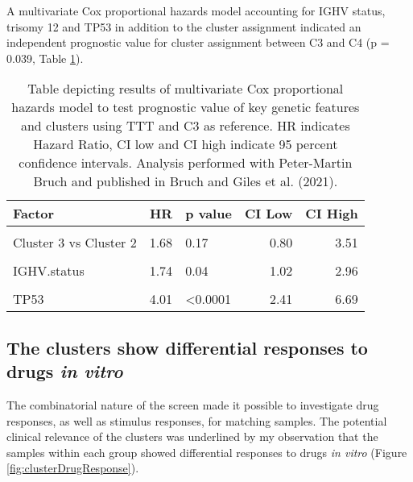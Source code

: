 \documentclass[11pt, a4paper, twosided]{book}
\begin{document}
A multivariate Cox proportional hazards model accounting for IGHV status, trisomy 12 and TP53 in addition to the cluster assignment indicated an independent prognostic value for cluster assignment between C3 and C4 (p = 0.039, Table \ref{tab:clusterCox}).
\begin{table}

\caption{\label{tab:clusterCox}Table depicting results of multivariate Cox proportional hazards model to test prognostic value of key genetic features and clusters using TTT and C3 as reference. HR indicates Hazard Ratio, CI low and CI high indicate 95 percent confidence intervals. Analysis performed with Peter-Martin Bruch and published in Bruch and Giles et al. (2021).}
\centering
\fontsize{7}{9}\selectfont
\begin{tabular}[t]{l|r|l|r|r}
\hline
Factor & HR & p value & CI Low & CI High\\
\hline
\cellcolor[HTML]{E2E868}{Cluster 3 vs Cluster 1} & \cellcolor[HTML]{E2E868}{0.96} & \cellcolor[HTML]{E2E868}{0.89} & \cellcolor[HTML]{E2E868}{0.54} & \cellcolor[HTML]{E2E868}{1.72}\\
\hline
Cluster 3 vs Cluster 2 & 1.68 & 0.17 & 0.80 & 3.51\\
\hline
\cellcolor[HTML]{E2E868}{Cluster 3 vs Cluster 4} & \cellcolor[HTML]{E2E868}{0.44} & \cellcolor[HTML]{E2E868}{0.04} & \cellcolor[HTML]{E2E868}{0.20} & \cellcolor[HTML]{E2E868}{0.96}\\
\hline
IGHV.status & 1.74 & 0.04 & 1.02 & 2.96\\
\hline
\cellcolor[HTML]{E2E868}{trisomy 12} & \cellcolor[HTML]{E2E868}{0.87} & \cellcolor[HTML]{E2E868}{0.71} & \cellcolor[HTML]{E2E868}{0.44} & \cellcolor[HTML]{E2E868}{1.76}\\
\hline
TP53 & 4.01 & <0.0001 & 2.41 & 6.69\\
\hline
\end{tabular}
\end{table}
\hypertarget{the-clusters-show-differential-responses-to-drugs-in-vitro}{%
\subsection{\texorpdfstring{The clusters show differential responses to drugs \emph{in vitro}}{The clusters show differential responses to drugs in vitro}}\label{the-clusters-show-differential-responses-to-drugs-in-vitro}}

The combinatorial nature of the screen made it possible to investigate drug responses, as well as stimulus responses, for matching samples. The potential clinical relevance of the clusters was underlined by my observation that the samples within each group showed differential responses to drugs \emph{in vitro} (Figure \ref{fig:clusterDrugResponse}).
\end{document}

